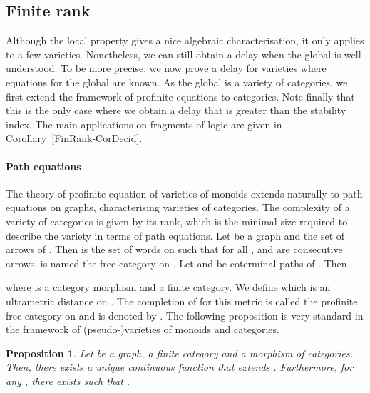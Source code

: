 \documentclass[submission,hidelink]{dmtcs-episciences}
\newtheorem{proposition}[theorem]{Proposition}
\begin{document}
\subsection{Finite rank}\label{Subsection:FiniteRank}


Although the local property gives a nice algebraic characterisation, it only applies to a few varieties.
Nonetheless, we can still obtain a delay when the global is well-understood.
To be more precise, we now prove a delay for varieties where equations for the global are known.
As the global is a variety of categories, we first extend the framework of profinite equations to categories.
Note finally that this is the only case where we obtain a delay that is greater than the stability index.
The main applications on fragments of logic are given in Corollary~\ref{FinRank-CorDecid}.

\paragraph{Path equations}
The theory of profinite equation of varieties of monoids extends naturally to path equations on graphs,
		characterising varieties of categories.
The complexity of a variety of categories is given by its rank,
		which is the minimal size required to describe the variety in terms of path equations.
Let  be a graph and  the set of arrows of . Then 
			is the set of words on  such that for all
			,  and  are consecutive arrows.
			 is named the free category on .
Let  and  be coterminal paths of . Then
			
			where  is a category morphism and  a finite category.
			We define  which is an ultrametric distance  on .
			The completion of  for this metric is called the profinite free category on  and is denoted by .
			The following proposition is very standard in the framework of (pseudo-)varieties of monoids and categories.
\begin{proposition}
			Let  be a graph,  a finite category and  a morphism of categories.
			Then, there exists a unique continuous function  that extends .
			Furthermore, for any , there exists  such that .
		\end{proposition}
\end{document}
